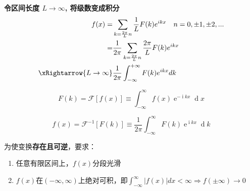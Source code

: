 \noindent \textbf{令区间长度 $L\to\infty$, 将级数变成积分}
$$\begin{aligned}
    f(x)=&\sum_{k=\frac{2\pi}{L}n}\frac{1}{L}F(k)e^{ikx}\quad n=0,\pm1,\pm2,...\\\
    =&\frac{1}{2\pi}\sum_{k=\frac{2\pi}{L}n}\frac{2\pi}{L}F(k)e^{ikx}\\
    \xRightarrow{L\to\infty}&\frac{1}{2\pi}\int_{-\infty}^{+\infty}F(k)e^{ikx}dk
\end{aligned}$$

\begin{dfn}[Fourier变换]
    $$\boxed{F(k)=\mathscr{F}[f(x)]\equiv\int_{-\infty}^\infty f(x)\operatorname{e}^{-\operatorname{i}kx}\operatorname{d}x}$$
\end{dfn}

\begin{dfn}[Fourier逆变换]
    $$\boxed{f(x)=\mathscr{F}^{-1}[F(k)]\equiv\frac1{2\pi}\int_{-\infty}^\infty F(k)\operatorname{e}^{\operatorname{i}kx}\operatorname{d}k}$$
\end{dfn}

\noindent 为使变换\textbf{存在且可逆}，要求：
\begin{enumerate}
    \item 任意有限区间上，$f(x)$分段光滑
    \item $f(x)$在$(-\infty,\infty)$上绝对可积，即$\int_{-\infty}^{\infty}|f(x)|dx<\infty\Rightarrow f(\pm\infty)\to 0$
\end{enumerate}

